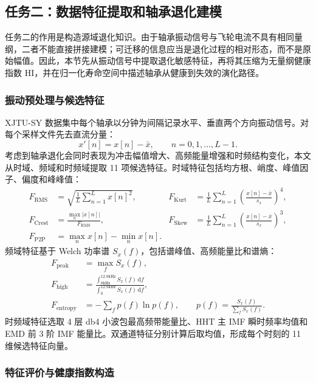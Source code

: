 \subsection{任务二：数据特征提取和轴承退化建模}

任务二的作用是构造源域退化知识。由于轴承振动信号与飞轮电流不具有相同量纲，二者不能直接拼接建模；可迁移的信息应当是退化过程的相对形态，而不是原始幅值。因此，本节先从振动信号中提取退化敏感特征，再将其压缩为无量纲健康指数 HI，并在归一化寿命空间中描述轴承从健康到失效的演化路径。

\subsubsection{振动预处理与候选特征}

XJTU-SY 数据集中每个轴承以分钟为间隔记录水平、垂直两个方向振动信号。对每个采样文件先去直流分量：
\begin{equation}
  \label{eq:q2_demean}
  x'[n]=x[n]-\bar x,\qquad n=0,1,\ldots,L-1.
\end{equation}
考虑到轴承退化会同时表现为冲击幅值增大、高频能量增强和时频结构变化，本文从时域、频域和时频域提取 11 项候选特征。时域特征包括均方根、峭度、峰值因子、偏度和峰峰值：
\begin{align}
  F_{\mathrm{RMS}}&=\sqrt{\frac{1}{L}\sum_{n=1}^{L}x[n]^2},&
  F_{\mathrm{Kurt}}&=\frac{1}{L}\sum_{n=1}^{L}\left(\frac{x[n]-\bar x}{s_x}\right)^4,\\
  F_{\mathrm{Crest}}&=\frac{\max_n |x[n]|}{F_{\mathrm{RMS}}},&
  F_{\mathrm{Skew}}&=\frac{1}{L}\sum_{n=1}^{L}\left(\frac{x[n]-\bar x}{s_x}\right)^3,\\
  F_{\mathrm{P2P}}&=\max_n x[n]-\min_n x[n].&
\end{align}
频域特征基于 Welch 功率谱 $S_x(f)$，包括谱峰值、高频能量比和谱熵：
\begin{align}
  F_{\mathrm{peak}}&=\max_f S_x(f),\\
  F_{\mathrm{high}}&=
  \frac{\int_{8\mathrm{kHz}}^{12.8\mathrm{kHz}}S_x(f)\,\mathrm df}
       {\int_{0}^{12.8\mathrm{kHz}}S_x(f)\,\mathrm df},\\
  F_{\mathrm{entropy}}&=-\sum_f p(f)\ln p(f),
  \qquad
  p(f)=\frac{S_x(f)}{\sum_f S_x(f)}.
\end{align}
时频域特征选取 4 层 db4 小波包最高频带能量比、HHT 主 IMF 瞬时频率均值和 EMD 前 3 阶 IMF 能量比。双通道特征分别计算后取均值，形成每个时刻的 11 维候选特征向量。

\subsubsection{特征评价与健康指数构造}

